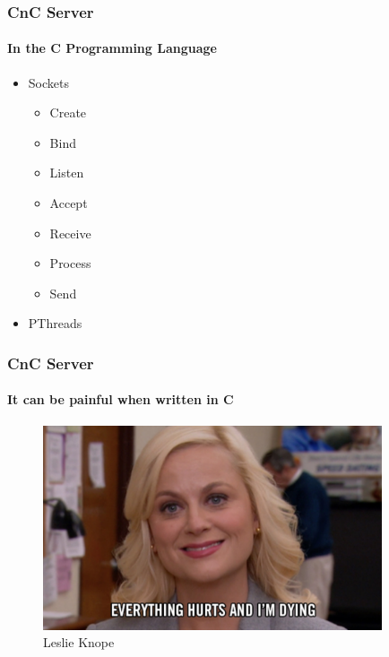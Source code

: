 \documentclass[aspectratio=169]{beamer}
\begin{document}
\begin{frame}
  \frametitle{CnC Server}
  \framesubtitle{In the C Programming Language}
  \begin{itemize}
  \item{Sockets}
    \begin{itemize}
    \item{Create}
    \item{Bind}
    \item{Listen}
    \item{Accept}
    \item{Receive}
    \item{Process}
    \item{Send}
    \end{itemize}
  \item{PThreads}
  \end{itemize}
\end{frame}

\begin{frame}
  \frametitle{CnC Server}
  \framesubtitle{It can be painful when written in C}
  \begin{center}
    \begin{figure}
      \includegraphics[width=10cm,keepaspectratio]{everything_hurts}
      \caption{Leslie Knope}
    \end{figure}
  \end{center}
\end{frame}
\end{document}
